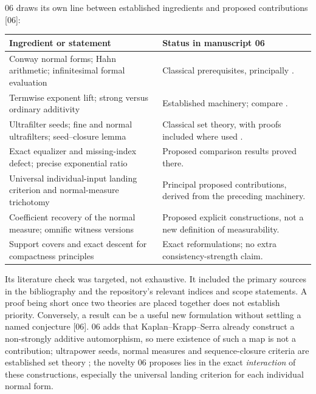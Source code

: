 \documentclass[11pt,letterpaper]{article}
\numberwithin{equation}{section}
\theoremstyle{definition}
\theoremstyle{remark}
\newcommand{\src}[1]{\textup{\textsf{\small[#1]}}}%
\begin{document}
06 draws its own line between established ingredients and proposed
contributions \src{06}:

\begin{center}\small
\begin{longtable}{@{}P{0.43\textwidth}P{0.51\textwidth}@{}}
\toprule
Ingredient or statement & Status in manuscript 06\\
\midrule\endhead
Conway normal forms; Hahn arithmetic; infinitesimal formal evaluation
 & Classical prerequisites, principally \cite{Conway,Gonshor}.\\[4pt]
Termwise exponent lift; strong versus ordinary additivity
 & Established machinery; compare \cite{KKS}.\\[4pt]
Ultrafilter seeds; fine and normal ultrafilters; seed--closure lemma
 & Classical set theory, with proofs included where used
   \cite{Neeman,Williams}.\\[4pt]
Exact equalizer and missing-index defect; precise exponential ratio
 & Proposed comparison results proved there.\\[4pt]
Universal individual-input landing criterion and normal-measure trichotomy
 & Principal proposed contributions, derived from the preceding machinery.\\[4pt]
Coefficient recovery of the normal measure; omnific witness versions
 & Proposed explicit constructions, not a new definition of measurability.\\[4pt]
Support covers and exact descent for compactness principles
 & Exact reformulations; no extra consistency-strength claim.\\
\bottomrule
\end{longtable}
\end{center}
Its literature check was targeted, not exhaustive. It included the primary
sources in the bibliography and the repository's relevant indices and scope
statements. A proof being short once two theories are placed together does
not establish priority. Conversely, a result can be a useful new
formulation without settling a named conjecture \src{06}. 06 adds that
Kaplan--Krapp--Serra already construct a non-strongly additive
automorphism, so mere existence of such a map is not a contribution;
ultrapower seeds, normal measures and sequence-closure criteria are
established set theory \cite{Neeman,Williams}; the novelty 06 proposes lies
in the exact \emph{interaction} of these constructions, especially the
universal landing criterion for each individual normal form.
\end{document}
